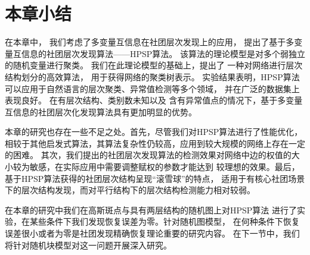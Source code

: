 \section{本章小结}\label{sec:hierarchical_summary}
在本章中，
我们考虑了多变量互信息在社团层次发现上的应用，
提出了基于多变量互信息的社团层次发现算法——HPSP算法。
该算法的理论模型是对多个弱独立的随机变量进行聚类。
我们在此理论模型的基础上，提出了
一种对网络进行层次结构划分的高效算法，
用于获得网络的聚类树表示。
实验结果表明，HPSP算法可以应用于自然语言的层次聚类、异常值检测等多个领域，
并在广泛的数据集上表现良好。
在有层次结构、类别数未知以及
含有异常值点的情况下，基于多变量互信息的社团层次化发现算法具有更加明显的优势。


本章的研究也存在一些不足之处。首先，尽管我们对HPSP算法进行了性能优化，
相较于其他启发式算法，其算法复杂性仍较高，应用到较大规模的网络上存在一定的困难。
其次，我们提出的社团层次发现算法的检测效果对网络中边的权值的大小较为敏感，在实际应用中需要调整赋权的参数才能达到
较理想的效果。最后，基于HPSP算法获得的社团层次结构呈现“滚雪球”的特点，
适用于有核心社团场景下的层次结构发现，而对平行结构下的层次结构检测能力相对较弱。

在本章的研究中我们在高斯斑点与具有两层结构的随机图上对HPSP算法
进行了实验，在某些条件下我们发现恢复误差为零。针对随机图模型，
在何种条件下恢复误差很小或者为零是社团发现精确恢复理论重要的研究内容。
在下一节中，我们将针对随机块模型对这一问题开展深入研究。
